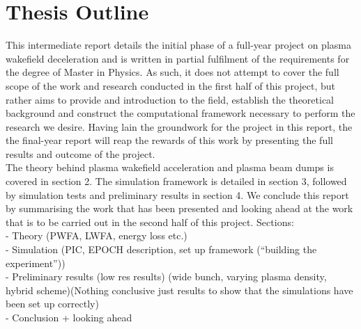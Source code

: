 \section{Thesis Outline}
This intermediate report details the initial phase of a full-year project on plasma wakefield deceleration and is written in partial fulfilment of the requirements for the degree of Master in Physics. As such, it does not attempt to cover the full scope of the work and research conducted in the first half of this project, but rather aims to provide and introduction to the field, establish the theoretical background and construct the computational framework necessary to perform the research we desire. Having lain the groundwork for the project in this report, the the final-year report will reap the rewards of this work by presenting the full results and outcome of the project.\\
The theory behind plasma wakefield acceleration and plasma beam dumps is covered in section 2. The simulation framework is detailed in section 3, followed by simulation tests and preliminary results in section 4. We conclude this report by summarising the work that has been presented and looking ahead at the work that is to be carried out in the second half of this project.
Sections:\\
- Theory (PWFA, LWFA, energy loss etc.)\\
- Simulation (PIC, EPOCH description, set up framework (“building the experiment”))\\
- Preliminary results (low res results) (wide bunch, varying plasma density, hybrid scheme)(Nothing conclusive just results to show that the simulations have been set up correctly)\\
- Conclusion + looking ahead\\

